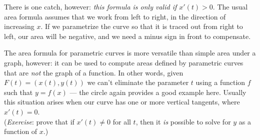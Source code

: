 \documentclass[letterpaper,12pt]{article}
\begin{document}
There is one catch, however: \emph{this formula is only valid if $x'(t)>0$}. The usual area formula assumes that we work from left to right, in the direction of increasing $x$. If we parametrize the curve so that it is traced out from right to left, our area will be negative, and we need a minus sign in front to compensate.

The area formula for parametric curves is more versatile than simple area under a graph, however: it can be used to compute areas defined by parametric curves that are {\em not} the graph of a function. In other words, given $F(t)=(x(t),y(t))$ we can't eliminate the parameter $t$ using a function $f$ such that $y=f(x)$ --- the circle again provides a good example here. Usually this situation arises when our curve has one or more vertical tangents, where $x'(t)=0$.\\ ({\em Exercise}: prove that if $x'(t)\neq 0$ for all $t$, then it {\em is} possible to solve for $y$ as a function of $x$.)
\end{document}
